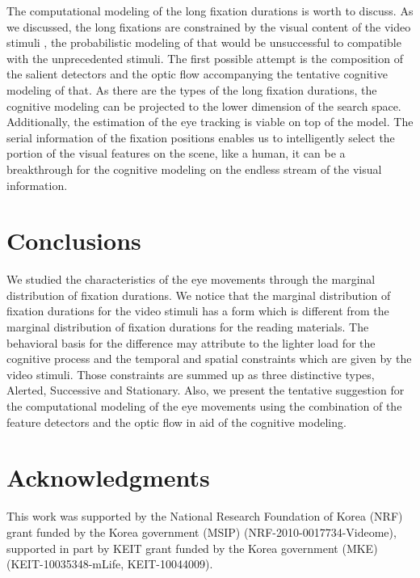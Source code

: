 \documentclass[10pt,letterpaper]{article}
\begin{document}
The computational modeling of the long fixation durations is worth to discuss. As we discussed, the long fixations are constrained by the visual content of the video stimuli \cite{zhang2013}, the probabilistic modeling of that would be unsuccessful to compatible with the unprecedented stimuli. The first possible attempt is the composition of the salient detectors \cite{marr1980,canny1986} and the optic flow \cite{koenderink1986} accompanying the tentative cognitive modeling of that. As there are the types of the long fixation durations, the cognitive modeling can be projected to the lower dimension of the search space. Additionally, the estimation of the eye tracking is viable on top of the model. The serial information of the fixation positions enables us to intelligently select the portion of the visual features on the scene, like a human, it can be a breakthrough for the cognitive modeling on the endless stream of the visual information.


\section{Conclusions}

We studied the characteristics of the eye movements through the marginal distribution of fixation durations. We notice that the marginal distribution of fixation durations for the video stimuli has a form which is different from the marginal distribution of fixation durations for the reading materials. The behavioral basis for the difference may attribute to the lighter load for the cognitive process and the temporal and spatial constraints which are given by the video stimuli. Those constraints are summed up as three distinctive types, Alerted, Successive and Stationary. Also, we present the tentative suggestion for the computational modeling of the eye movements using the combination of the feature detectors and the optic flow in aid of the cognitive modeling.


\section{Acknowledgments}

This work was supported by the National Research Foundation of Korea (NRF) grant funded by the Korea government (MSIP) (NRF-2010-0017734-Videome), supported in part by KEIT grant funded by the Korea government (MKE) (KEIT-10035348-mLife, KEIT-10044009).



\setlength{\bibleftmargin}{.125in}
\setlength{\bibindent}{-\bibleftmargin}


\end{document}
